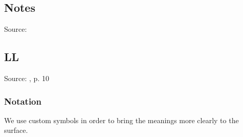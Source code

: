 \documentclass{article}
\begin{document}




\subsection{Notes}

Source: 

\subsection{LL}

Source: \parencite{Girard95linearlogic}, p. 10

\subsubsection{Notation}

We use custom symbols in order to bring the meanings more clearly to
the surface.
\end{document}
